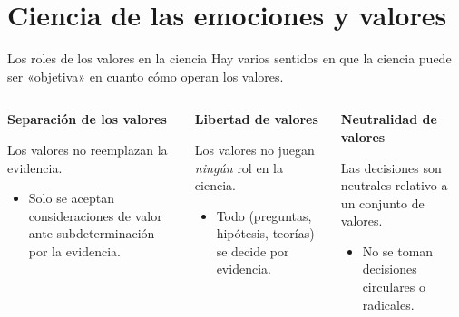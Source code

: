 \documentclass[%
  9pt,
  spanish, %
  ignorenonframetext,
  aspectratio=169, %
]{beamer}
\providecommand{\tightlist}{}
\begin{document}
\section{Ciencia de las emociones y
valores}\label{ciencia-de-las-emociones-y-valores}

\begin{frame}{Los roles de los valores en la ciencia}
  \label{los-roles-de-los-valores-en-la-ciencia}
  Hay varios sentidos en que la ciencia puede ser «objetiva» en cuanto
  cómo operan los valores. \pause

  \begin{columns}[T,onlytextwidth]
    \begin{column}{0.3\textwidth}
      \textbf{Separación de los valores}

      \pause

      Los valores no reemplazan la evidencia.

      \pause

      \begin{itemize}
          \tightlist
        \item
          Solo se aceptan consideraciones de valor ante subdeterminación por la
          evidencia. \pause
      \end{itemize}
    \end{column}

    \begin{column}{0.3\textwidth}
      \textbf{Libertad de valores}

      \pause

      Los valores no juegan \emph{ningún} rol en la ciencia.

      \pause

      \begin{itemize}
          \tightlist
        \item
          Todo (preguntas, hipótesis, teorías) se decide por evidencia. \pause
      \end{itemize}
    \end{column}

    \begin{column}{0.3\textwidth}
      \textbf{Neutralidad de valores}

      \pause

      Las decisiones son neutrales relativo a un conjunto de valores.

      \pause

      \begin{itemize}
          \tightlist
        \item
          No se toman decisiones circulares o radicales.
      \end{itemize}
    \end{column}
  \end{columns}
\end{frame}
\end{document}
